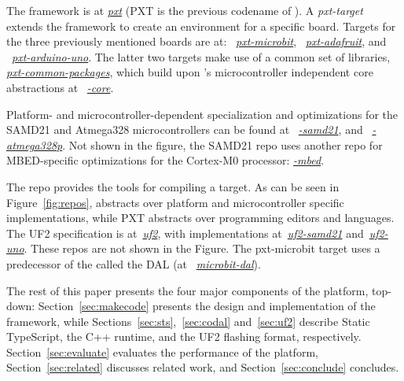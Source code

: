 The \MC framework 
is at \emph{\href{https://github.com/microsoft/pxt}{pxt}} (PXT is the previous codename of \MCN). 
A \emph{pxt-target} extends the framework to create an environment for a specific board. Targets
for the three previously mentioned boards are at: 
~\emph{\href{https://github.com/microsoft/pxt-microbit}{pxt-microbit}}, 
~\emph{\href{https://github.com/microsoft/pxt-adafruit}{pxt-adafruit}}, and
~\emph{\href{https://github.com/microsoft/pxt-arduino-uno}{pxt-arduino-uno}}.
The latter two targets make use of a common set of libraries, 
\emph{\href{https://github.com/microsoft/pxt-common-packages}{pxt-common-packages}},
which build upon \CON's microcontroller independent core abstractions at
~\emph{\href{https://github.com/lancaster-university/\CO-core}{\COLN-core}}.  

Platform- and microcontroller-dependent specialization and optimizations for 
the SAMD21 and Atmega328 microcontrollers can be found at
~\emph{\href{https://github.com/lancaster-university/codal-samd21}{\COLN-samd21}}, 
and
~\emph{\href{https://github.com/lancaster-university/codal-atmega328p}{\COLN-atmega328p}}.
Not shown in the figure, the SAMD21 repo uses another repo for
MBED-specific optimizations for the Cortex-M0 processor: \emph{\href{https://github.com/lancaster-university/codal-mbed}{\COLN-mbed}}.

The repo \emph{\href{https://github.com/lancaster-university/codal}{\COLN}} provides the
tools for compiling a \CO target.  As can be seen in Figure~\ref{fig:repos}, 
\CO abstracts over platform and microcontroller specific
implementations, while PXT abstracts over programming editors and languages.
The UF2 specification is at~\emph{\href{https://github.com/microsoft/uf2}{uf2}},
with implementations at~\emph{\href{https://github.com/microsoft/uf2-samd21}{uf2-samd21}}
and~\emph{\href{https://github.com/mmoskal/uf2-uno}{uf2-uno}}. These repos are not
shown in the Figure. 
The pxt-microbit target uses a predecessor of the \CO called the DAL (at
~\emph{\href{https://github.com/lancaster-university/microbit-dal}{microbit-dal}}).

The rest of this paper presents the four major components of the platform,
top-down: Section~\ref{sec:makecode} presents the design 
and implementation of the \MC framework, while 
Sections~\ref{sec:sts},~\ref{sec:codal} and~\ref{sec:uf2} describe Static TypeScript,
the \CO C++ runtime, and the UF2 flashing format, respectively.  
Section~\ref{sec:evaluate} evaluates the performance of the platform,
Section~\ref{sec:related} discusses related work, and Section~\ref{sec:conclude}
concludes.
